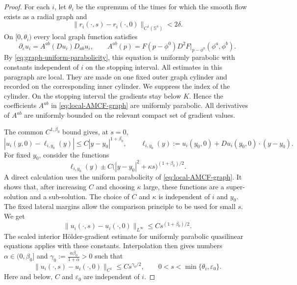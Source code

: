 \documentclass[11pt,reqno]{amsart}
\theoremstyle{definition}
\theoremstyle{remark}
\numberwithin{equation}{section}
\begin{document}
\begin{proof}
For each $i$, let $\theta_i$ be the supremum of the times for which the smooth flow exists as a radial graph and
\begin{equation*}
 \|r_i(\cdot,s)-r_i(\cdot,0)\|_{C^1(\mathbb S^n)}<2\delta.
\end{equation*}
On $[0,\theta_i)$ every local graph function satisfies
\begin{equation}
\label{eq:local-AMCF-graph}
 \partial_\varepsilon u_i
 =A^{ab}(Du_i)D_{ab}u_i,
 \qquad
 A^{ab}(p)=F(p-\phi^0)
 D^2F|_{p-\phi^0}(\phi^a,\phi^b).
\end{equation}
By \eqref{eq:graph-uniform-parabolicity}, this equation is uniformly parabolic with constants independent of $i$ on the stopping interval. 
All estimates in this paragraph are local. They are made on one fixed outer graph cylinder and recorded on the corresponding inner cylinder. We suppress the index of the cylinder. On the stopping interval the gradients stay below $K$. Hence the coefficients $A^{ab}$ in \eqref{eq:local-AMCF-graph} are uniformly parabolic. All derivatives of $A^{ab}$ are uniformly bounded on the relevant compact set of gradient values.

The common $C^{1,\beta_0}$ bound gives, at $s=0$,
\begin{equation*}
 |u_i(y,0)-\ell_{i,y_0}(y)|\leq C|y-y_0|^{1+\beta_0},
 \qquad
 \ell_{i,y_0}(y):=u_i(y_0,0)+Du_i(y_0,0)\cdot(y-y_0).
\end{equation*}
For fixed $y_0$, consider the functions
\begin{equation*}
 \ell_{i,y_0}(y)\pm C\bigl(|y-y_0|^2+\kappa s\bigr)^{(1+\beta_0)/2}.
\end{equation*}
A direct calculation uses the uniform parabolicity of \eqref{eq:local-AMCF-graph}. It shows that, after increasing $C$ and choosing $\kappa$ large, these functions are a super-solution and a sub-solution. The choice of $C$ and $\kappa$ is independent of $i$ and $y_0$. The fixed lateral margins allow the comparison principle to be used for small $s$. We get
\begin{equation*}
 \|u_i(\cdot,s)-u_i(\cdot,0)\|_{L^\infty}
 \leq C s^{(1+\beta_0)/2}.
\end{equation*}
The scaled interior H\"older-gradient estimate for uniformly parabolic quasilinear equations \cite[Theorem~12.3]{Lie96} applies with these constants. Interpolation then gives numbers $\alpha\in(0,\beta_0]$ and $\gamma_0:=\frac{\alpha\beta_0}{1+\alpha}>0$ such that
\begin{equation}
\label{eq:C1-initial-modulus}
 \|u_i(\cdot,s)-u_i(\cdot,0)\|_{C^1}
 \leq C s^{\gamma_0/2},
 \qquad 0<s<\min\{\theta_i,\varepsilon_0\}.
\end{equation}
Here and below, $C$ and $\varepsilon_0$ are independent of $i$.


\end{proof}
\end{document}
